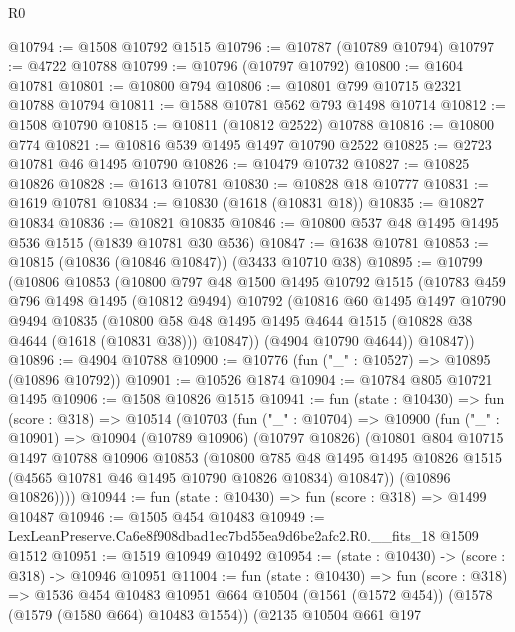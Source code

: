\begin{lexlean}{R0}
\begin{coremodule}
@10794 := @1508 @10792 @1515
@10796 := @10787 (@10789 @10794)
@10797 := @4722 @10788
@10799 := @10796 (@10797 @10792)
@10800 := @1604 @10781
@10801 := @10800 @794
@10806 := @10801 @799 @10715 @2321 @10788 @10794
@10811 := @1588 @10781 @562 @793 @1498 @10714
@10812 := @1508 @10790
@10815 := @10811 (@10812 @2522) @10788
@10816 := @10800 @774
@10821 := @10816 @539 @1495 @1497 @10790 @2522
@10825 := @2723 @10781 @46 @1495 @10790
@10826 := @10479 @10732
@10827 := @10825 @10826
@10828 := @1613 @10781
@10830 := @10828 @18 @10777
@10831 := @1619 @10781
@10834 := @10830 (@1618 (@10831 @18))
@10835 := @10827 @10834
@10836 := @10821 @10835
@10846 := @10800 @537 @48 @1495 @1495 @536 @1515 (@1839 @10781 @30 @536)
@10847 := @1638 @10781
@10853 := @10815 (@10836 (@10846 @10847)) (@3433 @10710 @38)
@10895 := @10799
    (@10806
      @10853
      (@10800
        @797
        @48
        @1500
        @1495
        @10792
        @1515
        (@10783
          @459
          @796
          @1498
          @1495
          (@10812 @9494)
          @10792
          (@10816
            @60
            @1495
            @1497
            @10790
            @9494
            @10835
            (@10800 @58 @48 @1495 @1495 @4644 @1515 (@10828 @38 @4644 (@1618 (@10831 @38))) @10847))
          (@4904 @10790 @4644))
        @10847))
@10896 := @4904 @10788
@10900 := @10776 (fun ("_" : @10527) => @10895 (@10896 @10792))
@10901 := @10526 @1874
@10904 := @10784 @805 @10721 @1495
@10906 := @1508 @10826 @1515
@10941 := fun (state : @10430) =>
  fun (score : @318) =>
  @10514
    (@10703
      (fun ("_" : @10704) =>
      @10900
        (fun ("_" : @10901) =>
        @10904
          (@10789 @10906)
          (@10797 @10826)
          (@10801
            @804
            @10715
            @1497
            @10788
            @10906
            @10853
            (@10800
              @785
              @48
              @1495
              @1495
              @10826
              @1515
              (@4565 @10781 @46 @1495 @10790 @10826 @10834)
              @10847))
          (@10896 @10826))))
@10944 := fun (state : @10430) => fun (score : @318) => @1499 @10487
@10946 := @1505 @454 @10483
@10949 := LexLeanPreserve.Ca6e8f908dbad1ec7bd55ea9d6be2afc2.R0.__fits_18 @1509 @1512
@10951 := @1519 @10949 @10492
@10954 := (state : @10430) -> (score : @318) -> @10946 @10951
@11004 := fun (state : @10430) =>
  fun (score : @318) =>
  @1536
    @454
    @10483
    @10951
    @664
    @10504
    (@1561 (@1572 @454))
    (@1578 (@1579 (@1580 @664) @10483 @1554))
    (@2135
      @10504
      @661
      @197

\end{coremodule}
\end{lexlean}
